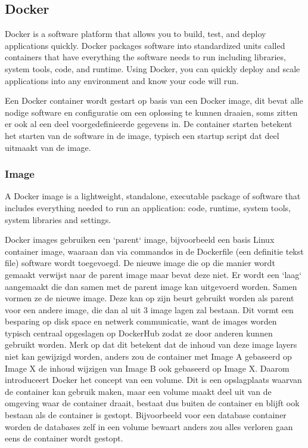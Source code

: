 \subsection{Docker}
Docker is a software platform that allows you to build, test, and deploy applications quickly. Docker packages software into standardized units called containers that have everything the software needs to run including libraries, system tools, code, and runtime. Using Docker, you can quickly deploy and scale applications into any environment and know your code will run. \autocite{AwsAmazon2023}

Een Docker container wordt gestart op basis van een Docker image, dit bevat alle nodige software en configuratie om een oplossing te kunnen draaien, soms zitten er ook al een deel voorgedefinieerde gegevens in. De container starten betekent het starten van de software in de image, typisch een startup script dat deel uitmaakt van de image.

\subsubsection{Image}
A Docker image is a lightweight, standalone, executable package of software that includes everything needed to run an application: code, runtime, system tools, system libraries and settings.\autocite{Docker2023a}

Docker images gebruiken een `parent` image, bijvoorbeeld een basis Linux container image, waaraan dan via commandos in de Dockerfile (een definitie tekst file) software wordt toegevoegd. De nieuwe image die op die manier wordt gemaakt verwijst naar de parent image maar bevat deze niet. Er wordt een `laag` aangemaakt die dan samen met de parent image kan uitgevoerd worden. Samen vormen ze de nieuwe image.
Deze kan op zijn beurt gebruikt worden als parent voor een andere image, die dan al uit 3 image lagen zal bestaan. Dit vormt een besparing op disk space en netwerk communicatie, want de images worden typisch centraal opgeslagen op DockerHub zodat ze door anderen kunnen gebruikt worden.
Merk op dat dit betekent dat de inhoud van deze image layers niet kan gewijzigd worden, anders zou de container met Image A gebaseerd op Image X de inhoud wijzigen van Image B ook gebaseerd op Image X. Daarom introduceert Docker het concept van een volume. Dit is een opslagplaats waarvan de container kan gebruik maken, maar een volume maakt deel uit van de omgeving waar de container draait, bestaat dus buiten de container en blijft ook bestaan als de container is gestopt. Bijvoorbeeld voor een database container worden de databases zelf in een volume bewaart anders zou alles verloren gaan eens de container wordt gestopt.

